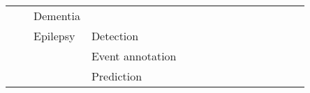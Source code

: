 \begin{tabular}{p{1.5cm}p{1.5cm}p{1.5cm}p{1.5cm}p{0.6cm}p{0.6cm}p{0.6cm}p{0.6cm}p{0.6cm}p{0.6cm}p{0.6cm}p{0.6cm}p{0.6cm}p{0.6cm}p{0.6cm}}
                                &                 & Dementia &   &                                         \cite{Morabito2017} &                                                                                                                             &                                                                        &                                      &                                                            &                      &                         &                               &                     &                         &                                                                      \\
                                &                 & Epilepsy & Detection &                          \cite{Yuan2018a, Golmohammadi2017} &                                         \cite{Yan2018, Hao2018, Ullah2018, Shea2018, Oshea2017, Acharya2017, Thodoroff2016} &  \cite{VanPutten2018a, Golmohammadi2017b, Shah2017, Golmohammadi2017a} &                    \cite{Turner2014} &                          \cite{Pramod2015, Omerhodzic2013} &                      &                         &               \cite{Taqi2017} &                     &                         &  \cite{Hussein2018, Ahmedt-Aristizabal2018, Talathi2017, Naderi2010} \\
                                &                 &                   & Event annotation &                                                             &                                                                                                                             &                                                                        &                                      &                                                            &                      &                         &              \cite{Yang2016b} &                     &                         &                                                                      \\
                                &                 &                   & Prediction &                                                             &                                                                                                 \cite{Truong2018, Page2016} &                                                                        &                                      &                                                            &                      &                         &                               &  \cite{Truong2018a} &                         &                                                  \cite{Tsiouris2018} \\

\end{tabular}
